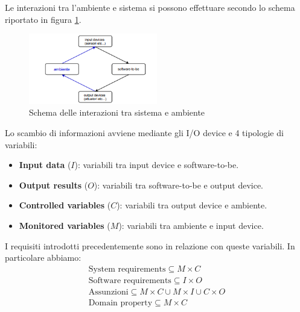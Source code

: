 Le interazioni tra l'ambiente e sistema si possono effettuare secondo lo schema
riportato in figura \ref{fig:int-sistema-ambiente}.
\begin{figure}[!ht]
      \centering
      \includegraphics[width=0.5\textwidth]{img/requirements/interazione-sistema-ambiente.png}
      \caption{Schema delle interazioni tra sistema e ambiente}
      \label{fig:int-sistema-ambiente}
\end{figure}
Lo scambio di informazioni avviene mediante gli I/O device e 4 tipologie di variabili:
\begin{itemize}
      \item \textbf{Input data} ($I$): variabili tra input device e software-to-be.
      \item \textbf{Output results} ($O$): variabili tra software-to-be e output
            device.
      \item \textbf{Controlled variables} ($C$): variabili tra output device e
            ambiente.
      \item \textbf{Monitored variables} ($M$): variabili tra ambiente e input
            device.
\end{itemize}
I requisiti introdotti precedentemente sono in relazione con queste variabili.
In particolare abbiamo:
\begin{equation}
      \begin{array}{l}
            \text{System requirements} \subseteq M \times C                        \\
            \text{Software requirements} \subseteq I \times O                      \\
            \text{Assunzioni} \subseteq M \times C \cup M \times I \cup C \times O \\
            \text{Domain property}\subseteq M\times C
      \end{array}
\end{equation}
